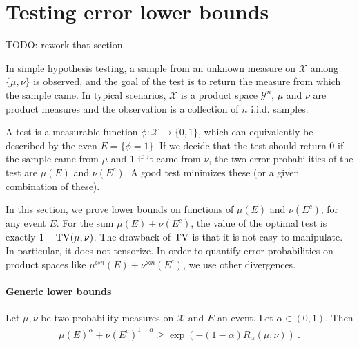 

\section{Testing error lower bounds}

TODO: rework that section.

In simple hypothesis testing, a sample from an unknown measure on $\mathcal X$ among $\{\mu, \nu\}$ is observed, and the goal of the test is to return the measure from which the sample came.
In typical scenarios, $\mathcal X$ is a product space $\mathcal Y^n$, $\mu$ and $\nu$ are product measures and the observation is a collection of $n$ i.i.d. samples.

A test is a measurable function $\phi : \mathcal X \to \{0,1\}$, which can equivalently be described by the even $E = \{\phi = 1\}$. If we decide that the test should return 0 if the sample came from $\mu$ and 1 if it came from $\nu$, the two error probabilities of the test are $\mu(E)$ and $\nu(E^c)$. A good test minimizes these (or a given combination of these).

In this section, we prove lower bounds on functions of $\mu(E)$ and $\nu(E^c)$, for any event $E$.
For the sum $\mu(E) + \nu(E^c)$, the value of the optimal test is exactly $1 - \operatorname{TV}(\mu, \nu)$.
The drawback of $\operatorname{TV}$ is that it is not easy to manipulate. In particular, it does not tensorize. In order to quantify error probabilities on product spaces like $\mu^{\otimes n}(E) + \nu^{\otimes n}(E^c)$, we use other divergences.

\paragraph{Generic lower bounds}

\begin{lemma}
  \label{lem:testing_bound_renyi_mean}
  Let $\mu, \nu$ be two probability measures on $\mathcal X$ and $E$ an event. Let $\alpha \in (0,1)$. Then
  \begin{align*}
  \mu(E)^\alpha + \nu(E^c)^{1 - \alpha}
  \ge \exp\left(-(1 - \alpha) R_{\alpha}(\mu, \nu)\right)
  \: .
  \end{align*}
\end{lemma}

